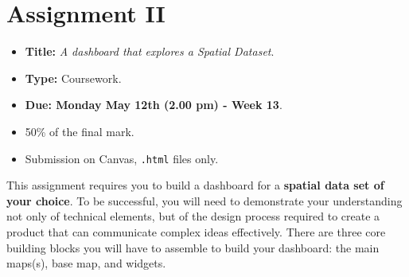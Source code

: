 \documentclass[
  letterpaper,
  DIV=11,
  numbers=noendperiod]{scrreprt}
\providecommand{\tightlist}{%
  \setlength{\itemsep}{0pt}\setlength{\parskip}{0pt}}\usepackage{longtable,booktabs,array}
\begin{document}

\chapter*{Assignment II}\label{assignment-ii}


\begin{itemize}
\tightlist
\item
  \textbf{Title:} \emph{A dashboard that explores a Spatial Dataset}.
\item
  \textbf{Type:} Coursework.
\item
  \textbf{Due: Monday May 12th (2.00 pm) - Week 13}.
\item
  50\% of the final mark.
\item
  Submission on Canvas, \texttt{.html} files only.
\end{itemize}

This assignment requires you to build a dashboard for a \textbf{spatial
data set of your choice}. To be successful, you will need to demonstrate
your understanding not only of technical elements, but of the design
process required to create a product that can communicate complex ideas
effectively. There are three core building blocks you will have to
assemble to build your dashboard: the main maps(s), base map, and
widgets.
\end{document}
